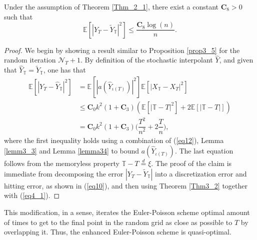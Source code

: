 \begin{proposition}
Under the assumption of Theorem \ref{Thm_2_1}, there exist a constant $\mathbf{C}_8 > 0$ such that
\begin{equation*}
    \mathbb{E}[|Y_T - \tilde{Y}_\mathbb{T}|^2] \leq \dfrac{\mathbf{C}_8 \log(n)}{n}.
\end{equation*}
\end{proposition}
\begin{proof}
We begin by showing a result similar to Proposition \ref{prop3_5} for the random iteration $\mathcal{N}_{T}+1$. By definition of the stochastic interpolant $\hat{Y}$, and given that $\hat{Y}_\mathbb{T} = \tilde{Y}_\mathbb{T}$, one has that 
\begin{equation}\label{eq4_1}
    \begin{aligned}
        \mathbb{E}[|Y_T - \hat{Y}_\mathbb{T}|^2] &= \mathbb{E}[|a(\hat{Y}_{\iota(T)})|^2] \mathbb{E}[|X_\mathbb{T} - X_T|^2]\\
        &\leq \mathbf{C}_0 k^2 (1 + \mathbf{C}_3) (\mathbb{E}[|\mathbb{T} - T|^2] + 2 \mathbb{E}[|\mathbb{T} - T|] )\\
        &= \mathbf{C}_0 k^2 (1 + \mathbf{C}_3) \bigg(\dfrac{T^2}{n^2} + 2 \dfrac{T}{n}\bigg),
    \end{aligned}
\end{equation}
where the first inequality holds using a combination of  (\ref{eq12}), Lemma \ref{lemm3_3} and \break Lemma \ref{lemma34} to bound $a(\hat{Y}_{\iota(T)})$. The last equation follows from the memoryless property \break $\mathbb{T} - T \overset{d}{=} \xi$. The proof of the claim is immediate from decomposing the error $|Y_T - \tilde{Y}_\mathbb{T}|$ into a discretization error and hitting error, as shown in (\ref{eq10}), and then using Theorem \ref{Thm3_2} together with (\ref{eq4_1}). 
\end{proof}
This modification, in a sense, iterates the Euler-Poisson scheme optimal amount of times to get to the final point in the random grid as close as possible to $T$ by overlapping it. Thus, the enhanced Euler-Poisson scheme is quasi-optimal.


